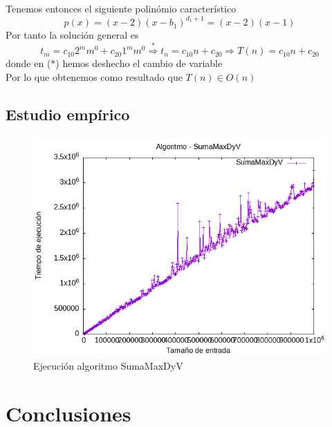 \documentclass[11pt,openany]{book}
\begin{document}
Tenemos entonces el siguiente polinómio característico
\begin{equation*}
    p(x)=(x-2)(x-b_1)^{d_1+1}=(x-2)(x-1)
\end{equation*}
Por tanto la solución general es
\begin{equation*}
    t_m=c_{10}2^mm^0+c_{20}1^mm^0  \overset{*}{\Longrightarrow}  t_n=c_{10}n+c_{20} \Longrightarrow T(n)=c_{10}n+c_{20}
\end{equation*}
donde en ($*$) hemos deshecho el cambio de variable \\
Por lo que obtenemos como resultado que $T(n) \in O(n)$

\section*{Estudio empírico}
\begin{figure}[h]
      \begin{minipage}{0.5\textwidth}
          \centering
          \includegraphics[width=\linewidth]{../Codigos/Graficas/SumaMaxDyV.png}
          \caption{Ejecución algoritmo SumaMaxDyV}
          \label{fig:SumaMaxDyV}
      \end{minipage}
\end{figure}


\chapter{Conclusiones}
\end{document}
